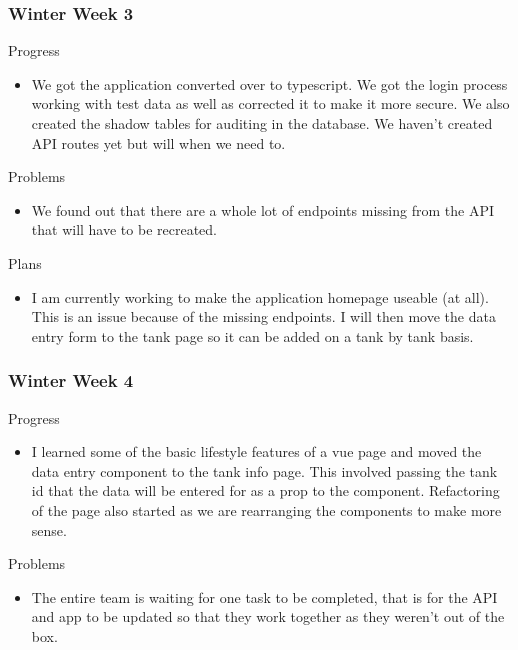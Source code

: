     \subsubsection{Winter Week 3}
    
        \noindent
        Progress
        \begin{itemize}
            \item We got the application converted over to typescript.  We got the login process working with test data as well as corrected it to make it more secure.  We also created the shadow tables for auditing in the database.  We haven’t created API routes yet but will when we need to.
        \end{itemize}
        
        \noindent
        Problems
        \begin{itemize}
            \item We found out that there are a whole lot of endpoints missing from the API that will have to be recreated.
        \end{itemize}
        
        \noindent
        Plans
        \begin{itemize}
            \item I am currently working to make the application homepage useable (at all).  This is an issue because of the missing endpoints.  I will then move the data entry form to the tank page so it can be added on a tank by tank basis.
        \end{itemize}
        
    \subsubsection{Winter Week 4}
    
        \noindent
        Progress
        \begin{itemize}
            \item I learned some of the basic lifestyle features of a vue page and moved the data entry component to the tank info page.  This involved passing the tank id that the data will be entered for as a prop to the component.  Refactoring of the page also started as we are rearranging the components to make more sense.
        \end{itemize}
        
        \noindent
        Problems
        \begin{itemize}
            \item The entire team is waiting for one task to be completed, that is for the API and app to be updated so that they work together as they weren’t out of the box.
        \end{itemize}
        
